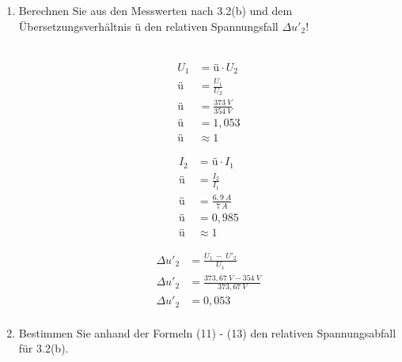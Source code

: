 \begin{enumerate}[label=\alph*)]
	\item Berechnen Sie aus den Messwerten nach 3.2(b) und dem Übersetzungsverhältnis ü
	      den relativen Spannungsfall $\Delta u'_2$!\\ \ \\

	      \begin{minipage}[r]{0.5\linewidth}
		      \begin{align*}
			      U_1 & = ü\cdot U_2            \\
			      ü   & = \frac{U_1}{U_2}       \\
			      ü   & = \frac{373\ V}{354\ V} \\
			      ü   & = 1,053                 \\
			      ü   & \approx 1
		      \end{align*}
	      \end{minipage}
	      \begin{minipage}[l]{0.5\linewidth}
		      \begin{align*}
			      I_2 & = ü\cdot I_1          \\
			      ü   & = \frac{I_2}{I_1}     \\
			      ü   & = \frac{6,9\ A}{7\ A} \\
			      ü   & = 0,985               \\
			      ü   & \approx 1
		      \end{align*}
	      \end{minipage}
	      \begin{align*}
		      \Delta u'_2 & = \frac{U_1\ -\ U'_2}{U_1}             \\
		      \Delta u'_2 & = \frac{373,67\ V - 354\ V}{373,67\ V} \\
		      \Delta u'_2 & = 0,053                                \\
	      \end{align*}
	\item Bestimmen Sie anhand der Formeln (11) - (13) den relativen Spannungsabfall für
	      3.2(b).


\end{enumerate}
